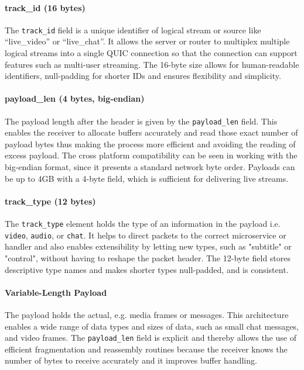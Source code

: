 \paragraph{track_id (16 bytes)}
The \texttt{track\_id} field is a unique identifier of logical stream or source like ``live\_video'' or ``live\_chat''. It allows the server or router to multiplex multiple logical streams into a single QUIC connection so that the connection can support features such as multi-user streaming. The 16-byte size allows for human-readable identifiers, null-padding for shorter IDs and ensures flexibility and simplicity.

\paragraph{payload\_len (4 bytes, big-endian)}
The payload length after the header is given by the \texttt{payload\_len} field. This enables the receiver to allocate buffers accurately and read those exact number of payload bytes thus making the process more efficient and avoiding the reading of excess payload. The cross platform compatibility can be seen in working with the big-endian format, since it presents a standard network byte order. Payloads can be up to 4GB with a 4-byte field, which is sufficient for delivering live streams.

\paragraph{track\_type (12 bytes)}
The \texttt{track\_type} element holds the type of an information in the payload i.e. \texttt{video}, \texttt{audio}, or \texttt{chat}. It helps to direct packets to the correct microservice or handler and also enables extensibility by letting new types, such as "subtitle" or "control", without having to reshape the packet header. The 12-byte field stores descriptive type names and makes shorter types null-padded, and is consistent.

\paragraph{Variable-Length Payload}
The payload holds the actual, e.g. media frames or messages. This architecture enables a wide range of data types and sizes of data, such as small chat messages, and video frames. The \texttt{payload\_len} field is explicit and thereby allows the use of efficient fragmentation and reassembly routines because the receiver knows the number of bytes to receive accurately and it improves buffer handling.

